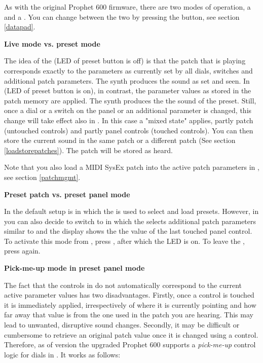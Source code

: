 As with the original Prophet 600 firmware, there are two modes of operation, a \presetmode and a \livemode. You can change between the two by pressing the \preset button, see section \ref{datapad}. 

\textbf{Live mode vs. preset mode}

The idea of the \livemode (LED of preset button is off) is that the patch that is playing corresponds exactly to the parameters as currently set by all dials, switches and additional patch parameters. The synth produces the sound as set and seen. In \presetmode (LED of preset button is on), in contrast, the parameter values as stored in the patch memory are applied. The synth produces the the sound of the preset. Still, once a dial or a switch on the panel or an additional parameter is changed, this change will take effect also in \presetmode. In this case a "mixed state" applies, partly patch (untouched controls) and partly panel controls (touched controls). You can then store the current sound in the same patch or a different patch (See section \ref{loadstorepatches}). The patch will be stored as heard. 

Note that you also load a MIDI SysEx patch into the active patch parameters in \presetmode, see section \ref{patchmgmt}.

\textbf{Preset patch vs. preset panel mode}

In \presetmode the default setup is \presetpatch in which the \termnumberpad is used to select and load presets. However, in \presetmode you can also decide to switch to \presetpanel in which the \termnumberpad selects additional patch parameters similar to \livemode and the display shows the the value of the last touched panel control. To activate this mode from \presetpatch, press \totape, after which the LED is on. To leave the \presetpanel, press \totape again. 

\textbf{Pick-me-up mode in preset panel mode}

The fact that the controls in \presetmode do not automatically correspond to the current active parameter values has two disadvantages. Firstly, once a control is touched it is immediately applied, irrespectively of where it is currently pointing and how far away that value is from the one used in the patch you are hearing. This may lead to unwanted, disruptive sound changes. Secondly, it may be difficult or cumbersome to retrieve an original patch value once it is changed using a control. Therefore, as of version \version the upgraded Prophet 600 supports a \textit{pick-me-up} control logic for dials in \presetpanel. It works as follows:

